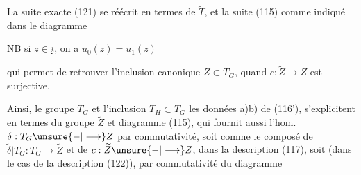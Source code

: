


La suite exacte (121) se réécrit en termes de $\widetilde T$, et  la suite (115) comme indiqué dans le diagramme


NB si $z\in\mathfrak{z}$, on a $u_0(z)=u_1(z)$

qui permet de retrouver l'inclusion canonique $Z\subset T_G$, quand $c:\widetilde Z\longrightarrow Z$ est surjective.

Ainsi, le groupe $T_G$ et l'inclusion $T_H\subset T_G$  les données a)b) de (116'), s'explicitent en termes du groupe $\widetilde Z$ et   diagramme (115), qui fournit aussi l'hom. $\delta:T_G\unsure{-|\longrightarrow}Z$  par commutativité, soit comme le composé de $\widetilde\delta|T_G:T_G\longrightarrow\widetilde Z$ et de $c:\widetilde Z\unsure{-|\longrightarrow} Z$, dans la  description (117), soit (dans le cas de la description (122)), par commutativité du diagramme

